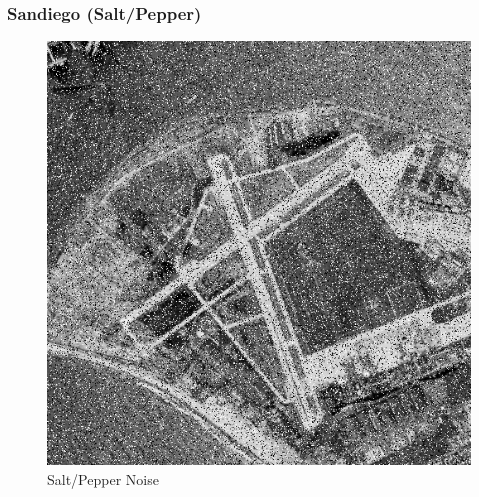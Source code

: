 \documentclass{article}
\begin{document}
    \subsubsection*{Sandiego (Salt/Pepper)}
    
    \begin{figure}[!htb]
    \begin{center}
     \includegraphics[scale=.3]{./basic_denoising/sandiego/sp.png}
     \caption{Salt/Pepper Noise}
    \end{center}
    \end{figure}
    
\end{document}
